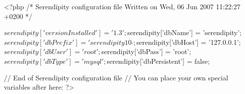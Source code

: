 \begin{ospcode}
<?php
	/*
	  Serendipity configuration file
	  Written on Wed, 06 Jun 2007 11:22:27 +0200
	*/

	$serendipity['versionInstalled']  = '1.3';
	$serendipity['dbName']            = 'serendipity';
	$serendipity['dbPrefix']          = 'serendipity10_';
	$serendipity['dbHost']            = '127.0.0.1';
	$serendipity['dbUser']            = 'root';
	$serendipity['dbPass']            = 'root';
	$serendipity['dbType']            = 'mysql';
	$serendipity['dbPersistent']      = false;

	// End of Serendipity configuration file
	// You can place your own special variables after here:
?>
\end{ospcode}
